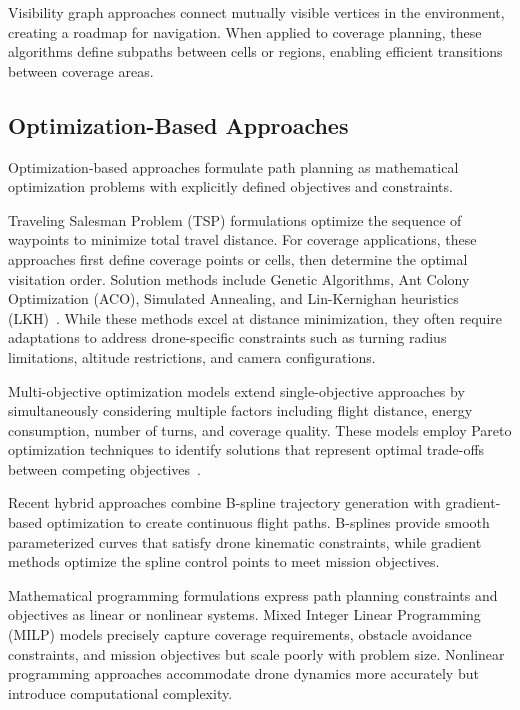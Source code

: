 Visibility graph approaches connect mutually visible vertices in the environment, creating a roadmap for navigation. When applied to coverage planning, these algorithms define subpaths between cells or regions, enabling efficient transitions between coverage areas.


\subsection{Optimization-Based Approaches}

Optimization-based approaches formulate path planning as mathematical optimization problems with explicitly defined objectives and constraints.

Traveling Salesman Problem (TSP) formulations optimize the sequence of waypoints to minimize total travel distance. For coverage applications, these approaches first define coverage points or cells, then determine the optimal visitation order. Solution methods include Genetic Algorithms, Ant Colony Optimization (ACO), Simulated Annealing, and Lin-Kernighan heuristics (LKH)~\cite{SmoothCoverage}. While these methods excel at distance minimization, they often require adaptations to address drone-specific constraints such as turning radius limitations, altitude restrictions, and camera configurations.

Multi-objective optimization models extend single-objective approaches by simultaneously considering multiple factors including flight distance, energy consumption, number of turns, and coverage quality. These models employ Pareto optimization techniques to identify solutions that represent optimal trade-offs between competing objectives~\cite{OptimizationUAV}.

Recent hybrid approaches combine B-spline trajectory generation with gradient-based optimization to create continuous flight paths. B-splines provide smooth parameterized curves that satisfy drone kinematic constraints, while gradient methods optimize the spline control points to meet mission objectives.

Mathematical programming formulations express path planning constraints and objectives as linear or nonlinear systems. Mixed Integer Linear Programming (MILP) models precisely capture coverage requirements, obstacle avoidance constraints, and mission objectives but scale poorly with problem size. Nonlinear programming approaches accommodate drone dynamics more accurately but introduce computational complexity.

